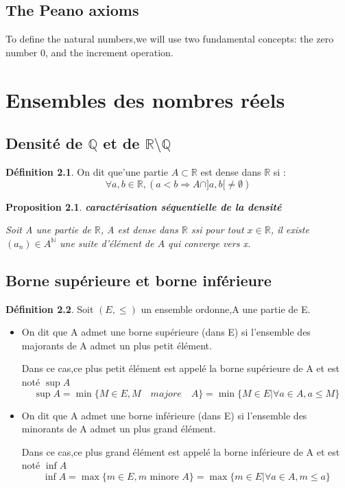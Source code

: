 \documentclass[12pt]{book}
\theoremstyle{definition}\newtheorem{dfn}{Définition}[chapter]
\theoremstyle{plain}\newtheorem{thm}{Théorème}[chapter]
\theoremstyle{plain}\newtheorem{prp}{Proposition}[chapter]
\theoremstyle{plain}\newtheorem{lem}{\bf Lemme}[chapter]
\theoremstyle{plain}\newtheorem{axm}{\bf Axiome}[chapter]
\theoremstyle{plain}\newtheorem{lmm}{\bf Lemme}[chapter]
\theoremstyle{plain}\newtheorem{exm}{\bf Example}[chapter]
\theoremstyle{plain}\newtheorem{cor}{\bf Corollaire}[chapter]
\theoremstyle{remark}\newtheorem{rem}{Remarque}[chapter]
\begin{document}
\section{The Peano axioms}

To define the natural numbers,we will use two fundamental concepts: the zero number 0, and the increment operation.



\chapter{Ensembles des nombres réels}
\section{Densité de $\mathbb{Q}$ et de $\mathbb{R\setminus Q}$}
\begin{dfn}
        On dit que'une partie $A\subset \mathbb{R}$ est dense dans $\mathbb{R}$ si :
        $$
        \forall a,b\in \mathbb{R},
        (a<b \Rightarrow A\cap ] a,b [\not=\emptyset )
        $$

\end{dfn}

\begin{prp}{\textbf{caractérisation séquentielle de la densité}}

        Soit A une partie de $\mathbb{R}$, A est dense dans $\mathbb{R}$ ssi pour
        tout $x \in \mathbb{R}$, il existe $(a_n)\in A^{\mathbb{N}}$ une suite d'élément de $A$ qui converge vers x.
\end{prp}

\section{Borne supérieure et borne inférieure}
\begin{dfn}
Soit $(E,\le)$ un ensemble ordonne,A une partie de E.
\begin{itemize}
        \item On dit que A admet une borne supérieure (dans E) si l'ensemble des majorants de A admet un plus petit élément.

        Dans ce cas,ce plus petit élément est appelé la borne supérieure de A et
        est noté $\sup A$
        $$
        \sup A=\min\{M\in E, M \quad majore\quad A\}=\min\{ M\in E  | \forall a\in A ,a\le M\}
        $$

        \item On dit que A admet une borne inférieure (dans E) si l'ensemble des minorants de A admet un plus grand élément.

        Dans ce cas,ce plus grand élément est appelé la borne inférieure de A et
        est noté $\inf A$
                $$
        \inf A=\max\{m\in E, m\text{ minore }A\}=\max\{ m\in E  | \forall a\in A ,m\le a\}
        $$


\end{itemize}
\end{dfn}
\end{document}
